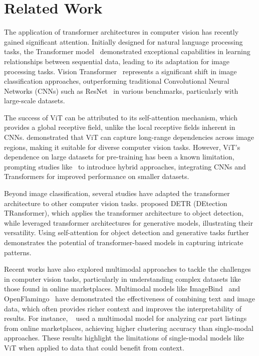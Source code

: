 \section{Related Work}
The application of transformer architectures in computer vision has recently gained significant attention. Initially designed for natural language processing tasks, the Transformer model~\cite{vaswani2023attentionneed} demonstrated exceptional capabilities in learning relationships between sequential data, leading to its adaptation for image processing tasks. Vision Transformer~\cite{dosovitskiy2021imageworth16x16words} represents a significant shift in image classification approaches, outperforming traditional Convolutional Neural Networks (CNNs) such as ResNet~\cite{he2016deep} in various benchmarks, particularly with large-scale datasets.

The success of ViT can be attributed to its self-attention mechanism, which provides a global receptive field, unlike the local receptive fields inherent in CNNs. \citet{dosovitskiy2021imageworth16x16words} demonstrated that ViT can capture long-range dependencies across image regions, making it suitable for diverse computer vision tasks. However, ViT's dependence on large datasets for pre-training has been a known limitation, prompting studies like~\citet{touvron2021training} to introduce hybrid approaches, integrating CNNs and Transformers for improved performance on smaller datasets.

Beyond image classification, several studies have adapted the transformer architecture to other computer vision tasks. \citet{carion2020endtoendobjectdetectiontransformers} proposed DETR (DEtection TRansformer), which applies the transformer architecture to object detection, while \citet{radford2016unsupervisedrepresentationlearningdeep} leveraged transformer architectures for generative models, illustrating their versatility. Using self-attention for object detection and generative tasks further demonstrates the potential of transformer-based models in capturing intricate patterns.

Recent works have also explored multimodal approaches to tackle the challenges in computer vision tasks, particularly in understanding complex datasets like those found in online marketplaces. Multimodal models like ImageBind~\cite{girdhar2023imagebind} and OpenFlamingo~\cite{alayrac2023flamingo} have demonstrated the effectiveness of combining text and image data, which often provides richer context and improves the interpretability of results. For instance, ~\citet{hamara2024latentenginemanifoldsanalyzing} used a multimodal model for analyzing car part listings from online marketplaces, achieving higher clustering accuracy than single-modal approaches. These results highlight the limitations of single-modal models like ViT when applied to data that could benefit from context.

